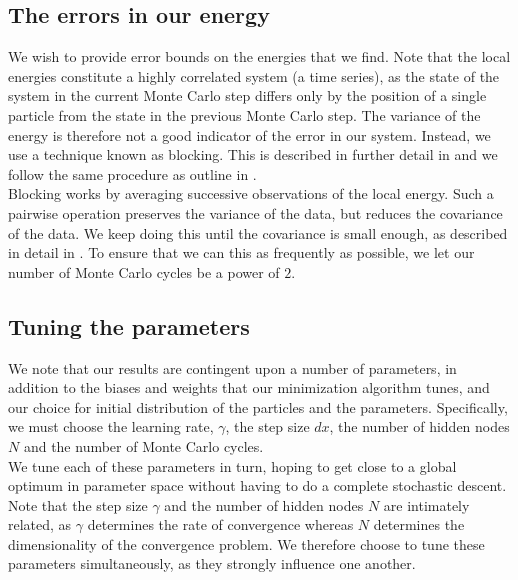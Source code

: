 \documentclass[a4paper, 10pt]{article}
\begin{document}
	\subsection{The errors in our energy}
	We wish to provide error bounds on the energies that we find. Note that the local energies constitute a highly correlated system (a time series), as the state of the system in the current Monte Carlo step differs only by the position of a single particle from the state in the previous Monte Carlo step. The variance of the energy is therefore not a good indicator of the error in our system. Instead, we use a technique known as blocking. This is described in further detail in \cite{Jonsson2018} and we follow the same procedure as outline in \cite{Heinsen2018}.\\
	\linebreak
	Blocking works by averaging successive observations of the local energy. Such a pairwise operation preserves the variance of the data, but reduces the covariance of the data. We keep doing this until the covariance is small enough, as described in detail in \cite{Jonsson2018}. To ensure that we can this as frequently as possible, we let our number of Monte Carlo cycles be a power of $2$. 
	\subsection{Tuning the parameters}\label{sec:met_tuning_parameters}
	We note that our results are contingent upon a number of parameters, in addition to the biases and weights that our minimization algorithm tunes, and our choice for initial distribution of the particles and the parameters. Specifically, we must choose the learning rate, $\gamma$, the step size $dx$, the number of hidden nodes $N$ and the number of Monte Carlo cycles.\\
	\linebreak
	We tune each of these parameters in turn, hoping to get close to a global optimum in parameter space without having to do a complete stochastic descent. Note that the step size $\gamma$ and the number of hidden nodes $N$ are intimately related, as $\gamma$ determines the rate of convergence whereas $N$ determines the dimensionality of the convergence problem. We therefore choose to tune these parameters simultaneously, as they strongly influence one another.
\end{document}
